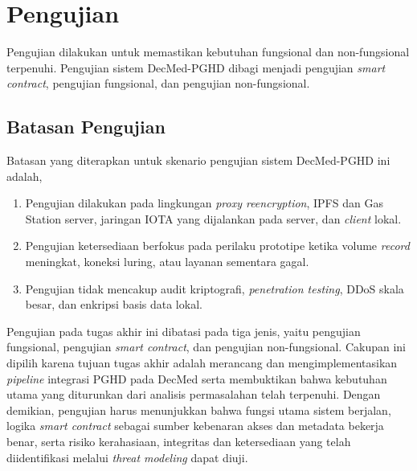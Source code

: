 \section{Pengujian}

Pengujian dilakukan untuk memastikan kebutuhan fungsional dan non-fungsional terpenuhi.
Pengujian sistem DecMed-PGHD dibagi menjadi pengujian \textit{smart contract}, pengujian fungsional, dan pengujian non-fungsional.

\subsection{Batasan Pengujian}

Batasan yang diterapkan untuk skenario pengujian sistem DecMed-PGHD ini adalah,

\begin{enumerate}
    \item Pengujian dilakukan pada lingkungan \textit{proxy reencryption}, IPFS dan Gas Station server, jaringan IOTA yang dijalankan pada server, dan \textit{client} lokal.
    \item Pengujian ketersediaan berfokus pada perilaku prototipe ketika volume \textit{record} meningkat, koneksi luring, atau layanan sementara gagal.
    \item Pengujian tidak mencakup audit kriptografi, \textit{penetration testing}, DDoS skala besar, dan enkripsi basis data lokal.
\end{enumerate}

Pengujian pada tugas akhir ini dibatasi pada tiga jenis, yaitu pengujian fungsional, pengujian \textit{smart contract}, dan pengujian non-fungsional. 
Cakupan ini dipilih karena tujuan tugas akhir adalah merancang dan mengimplementasikan \textit{pipeline} integrasi PGHD pada DecMed serta membuktikan bahwa kebutuhan utama yang diturunkan dari analisis permasalahan telah terpenuhi. 
Dengan demikian, pengujian harus menunjukkan bahwa fungsi utama sistem berjalan, logika \textit{smart contract} sebagai sumber kebenaran akses dan metadata bekerja benar, serta risiko kerahasiaan, integritas dan ketersediaan yang telah diidentifikasi melalui \textit{threat modeling} dapat diuji.


